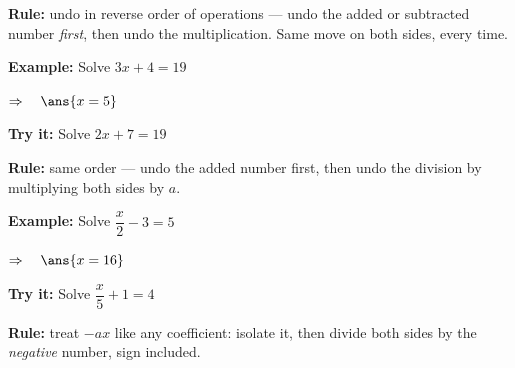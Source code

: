 \documentclass[12pt]{article}
\begin{document}


\begin{formulabox}
\textbf{Rule:} undo in reverse order of operations --- undo the added or subtracted
number \emph{first}, then undo the multiplication. Same move on both sides, every
time.
\end{formulabox}

\begin{examplebox}
\textbf{Example:} \quad Solve $3x + 4 = 19$

$\Rightarrow\quad \ans{x = 5}$
\end{examplebox}

\begin{tryitbox}
\textbf{Try it:} \quad Solve $2x + 7 = 19$\\[2pt]
\end{tryitbox}


\begin{formulabox}
\textbf{Rule:} same order --- undo the added number first, then undo the division
by multiplying both sides by $a$.
\end{formulabox}

\begin{examplebox}
\textbf{Example:} \quad Solve $\dfrac{x}{2} - 3 = 5$

$\Rightarrow\quad \ans{x = 16}$
\end{examplebox}

\begin{tryitbox}
\textbf{Try it:} \quad Solve $\dfrac{x}{5} + 1 = 4$\\[2pt]
\end{tryitbox}


\begin{formulabox}
\textbf{Rule:} treat $-ax$ like any coefficient: isolate it, then divide both
sides by the \emph{negative} number, sign included.
\end{formulabox}
\end{document}
